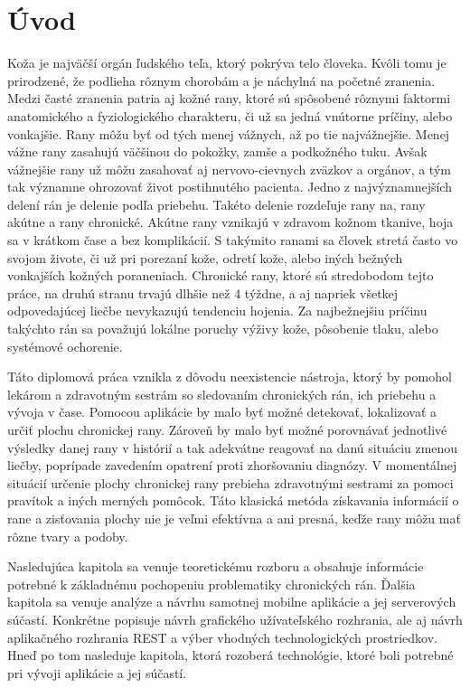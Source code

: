 \chapter{Úvod}
Koža je najväčší orgán ľudského teľa, ktorý pokrýva telo človeka. Kvôli tomu je prirodzené, že podlieha rôznym chorobám a je náchylná na početné zranenia. Medzi časté zranenia patria aj kožné rany, ktoré sú spôsobené rôznymi faktormi anatomického a fyziologického charakteru, či už sa jedná vnútorne príčiny, alebo vonkajšie. Rany môžu byť od tých menej vážnych, až po tie najvážnejšie. Menej vážne rany zasahujú väčšinou do pokožky, zamše a podkožného tuku. Avšak vážnejšie rany už môžu zasahovať aj nervovo-cievnych zväzkov a orgánov, a tým tak významne ohrozovať život postihnutého pacienta. Jedno z najvýznamnejších delení rán je delenie podľa priebehu. Takéto delenie rozdeľuje rany na, rany akútne a rany chronické. Akútne rany vznikajú v zdravom kožnom tkanive, hoja sa v krátkom čase a bez komplikácií. S takýmito ranami sa človek stretá často vo svojom živote, či už pri porezaní kože, odretí kože, alebo iných bežných vonkajších kožných poraneniach. Chronické rany, ktoré sú stredobodom tejto práce, na druhú stranu trvajú dlhšie než 4 týždne, a aj napriek všetkej odpovedajúcej liečbe nevykazujú tendenciu hojenia. Za najbežnejšiu príčinu takýchto rán sa považujú lokálne poruchy výživy kože, pôsobenie tlaku, alebo systémové ochorenie. 

Táto diplomová práca vznikla z dôvodu neexistencie nástroja, ktorý by pomohol lekárom a zdravotným sestrám so sledovaním chronických rán, ich priebehu a vývoja v čase. Pomocou aplikácie by malo byť možné detekovať, lokalizovať a určiť plochu chronickej rany. Zároveň by malo byť možné porovnávať jednotlivé výsledky danej rany v histórií a tak adekvátne reagovať na danú situáciu zmenou liečby, poprípade zavedením opatrení proti zhoršovaniu diagnózy. V momentálnej situácií určenie plochy chronickej rany prebieha zdravotnými sestrami za pomoci pravítok a iných merných pomôcok. Táto klasická metóda získavania informácií o rane a zisťovania plochy nie je veľmi efektívna a ani presná, keďže rany môžu mať rôzne tvary a podoby.
	
Nasledujúca kapitola sa venuje teoretickému rozboru a obsahuje informácie potrebné k základnému pochopeniu problematiky chronických rán. Ďalšia kapitola sa venuje analýze a návrhu samotnej mobilne aplikácie a jej serverových súčastí. Konkrétne popisuje návrh grafického užívateľského rozhrania, ale aj návrh aplikačného rozhrania REST a výber vhodných technologických prostriedkov. Hneď po tom nasleduje kapitola, ktorá rozoberá technológie, ktoré boli potrebné pri vývoji aplikácie a jej súčastí.